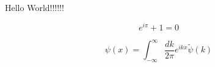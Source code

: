 \documentclass{article}
\begin{document}
Hello World!!!!!!

\begin{equation}
    e^{i\pi} + 1 = 0
\end{equation}

\begin{equation*}
    \psi(x) = \int_{-\infty}^{\infty} \frac{dk}{2\pi} e^{ikx} \tilde{\psi}(k)
\end{equation*}
\end{document}
